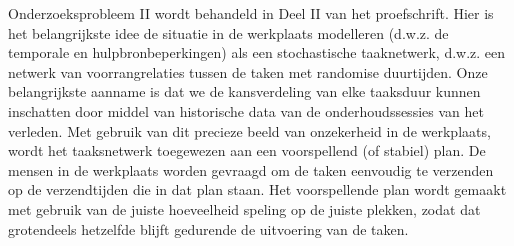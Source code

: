 Onderzoeksprobleem II wordt behandeld in Deel II van het proefschrift. 
Hier is het belangrijkste idee de situatie in de werkplaats modelleren (d.w.z. de temporale en hulpbronbeperkingen) als een stochastische taaknetwerk, 
d.w.z. een netwerk van voorrangrelaties tussen de taken met randomise duurtijden. 
Onze belangrijkste aanname is dat we de kansverdeling van elke taaksduur kunnen inschatten door middel van historische data van de onderhoudssessies van het verleden. 
Met gebruik van dit precieze beeld van onzekerheid in de werkplaats, 
wordt het taaksnetwerk toegewezen aan een voorspellend (of stabiel) plan. 
De mensen in de werkplaats worden gevraagd om de taken eenvoudig te verzenden op de verzendtijden die in dat plan staan. 
Het voorspellende plan wordt gemaakt met gebruik van de juiste hoeveelheid speling op de juiste plekken, 
zodat dat grotendeels hetzelfde blijft gedurende de uitvoering van de taken.

